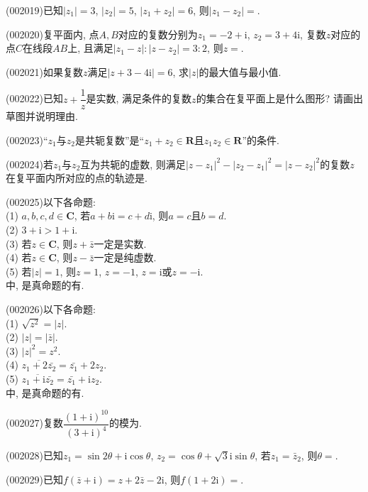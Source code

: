 \item (002019)已知$|z_1|=3$, $|z_2|=5$, $|z_1+z_2|=6$, 则$|z_1-z_2|=$.
\item (002020)复平面内, 点$A,B$对应的复数分别为$z_1=-2+\mathrm{i}$, $z_2=3+4\mathrm{i}$, 复数$z$对应的点$C$在线段$AB$上, 且满足$|z_1-z|:|z-z_2|=3:2$, 则$z=$.
\item (002021)如果复数$z$满足$|z+3-4\mathrm{i}|=6$, 求$|z|$的最大值与最小值.
\item (002022)已知$z+\dfrac{1}{z}$是实数, 满足条件的复数$z$的集合在复平面上是什么图形? 请画出草图并说明理由.
\item (002023)``$z_1$与$z_2$是共轭复数''是``$z_1+z_2\in \mathbf{R}$且$z_1z_2\in \mathbf{R}$''的条件.
\item (002024)若$z_1$与$z_2$互为共轭的虚数, 则满足$|z-z_1|^2-|z_2-z_1|^2=|z-z_2|^2$的复数$z$在复平面内所对应的点的轨迹是.
\item (002025)以下各命题:\\ 
(1) $a,b,c,d\in \mathbf{C}$, 若$a+b\mathrm{i}=c+d\mathrm{i}$, 则$a=c$且$b=d$.\\ 
(2) $3+\mathrm{i}>1+\mathrm{i}$.\\ 
(3) 若$z\in\mathbf{C}$, 则$z+\bar{z}$一定是实数.\\ 
(4) 若$z\in \mathbf{C}$, 则$z-\bar{z}$一定是纯虚数.\\ 
(5) 若$|z|=1$, 则$z=1$, $z=-1$, $z=\mathrm{i}$或$z=-\mathrm{i}$.\\ 
中, 是真命题的有.
\item (002026)以下各命题:\\ 
(1) $\sqrt{z^2}=|z|$.\\ 
(2) $|z|=|\bar{z}|$.\\ 
(3) $|z|^2=z^2$.\\ 
(4) $\overline{z_1+2\bar{z_2}}=\bar{z_1}+2z_2$.\\ 
(5) $\overline{z_1+\mathrm{i}\bar{z_2}}=\bar{z_1}+\mathrm{i} z_2$.\\ 
中, 是真命题的有.
\item (002027)复数$\dfrac{(1+\mathrm{i})^{10}}{(3+\mathrm{i})^4}$的模为.
\item (002028)已知$z_1=\sin 2\theta+\mathrm{i}\cos\theta$, $z_2=\cos\theta+\sqrt{3}\mathrm{i}\sin\theta$, 若$z_1=\bar{z}_2$, 则$\theta=$.
\item (002029)已知$f(\bar{z}+\mathrm{i})=z+2\bar{z}-2\mathrm{i}$, 则$f(1+2\mathrm{i})=$.
